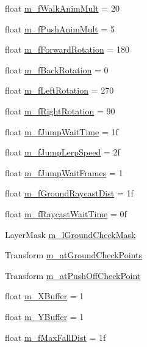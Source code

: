 \begin{DoxyCompactItemize}
\item 
float \mbox{\hyperlink{class_animal_ae003f54a88ce9c5790651eb2e2b739eb}{m\+\_\+f\+Walk\+Anim\+Mult}} = 20
\item 
float \mbox{\hyperlink{class_animal_a16a1fc92968f20b95877a6afff3108e7}{m\+\_\+f\+Push\+Anim\+Mult}} = 5
\item 
float \mbox{\hyperlink{class_animal_ac662f1892b85515e76ec7873d482df89}{m\+\_\+f\+Forward\+Rotation}} = 180
\item 
float \mbox{\hyperlink{class_animal_ae0c82e64109cba8e3186bec644f72ff4}{m\+\_\+f\+Back\+Rotation}} = 0
\item 
float \mbox{\hyperlink{class_animal_ae20b6c637e8cd4334fe8e0bff05a7872}{m\+\_\+f\+Left\+Rotation}} = 270
\item 
float \mbox{\hyperlink{class_animal_afe3df93e1c665aeb4232690655e81c34}{m\+\_\+f\+Right\+Rotation}} = 90
\item 
float \mbox{\hyperlink{class_animal_a62e54a6e632478daff40256ce4d3fbd5}{m\+\_\+f\+Jump\+Wait\+Time}} = 1f
\item 
float \mbox{\hyperlink{class_animal_a577330859c3a5bf5b0ae5690eb03dc3b}{m\+\_\+f\+Jump\+Lerp\+Speed}} = 2f
\item 
float \mbox{\hyperlink{class_animal_aa644cc3baee4917c5a8ff4ce6a7f5213}{m\+\_\+f\+Jump\+Wait\+Frames}} = 1
\item 
float \mbox{\hyperlink{class_animal_ad61d1d395ce25fc4996a0385347b7dd3}{m\+\_\+f\+Ground\+Raycast\+Dist}} = 1f
\item 
float \mbox{\hyperlink{class_animal_af615d2651b634514c081cdf5e8d0f5ed}{m\+\_\+f\+Raycast\+Wait\+Time}} = 0f
\item 
Layer\+Mask \mbox{\hyperlink{class_animal_a4dac26b3c8c4c5382d1d03ec917fe836}{m\+\_\+l\+Ground\+Check\+Mask}}
\item 
Transform \mbox{\hyperlink{class_animal_a52e29a5e08389bff22aa3c58fd51c51e}{m\+\_\+at\+Ground\+Check\+Points}}
\item 
Transform \mbox{\hyperlink{class_animal_af82430c5d281f7e015d07f65949b483d}{m\+\_\+at\+Push\+Off\+Check\+Point}}
\item 
float \mbox{\hyperlink{class_animal_a983bda54f5ac80081085024ddb6b1199}{m\+\_\+\+X\+Buffer}} = 1
\item 
float \mbox{\hyperlink{class_animal_a052f059393b9e50b56bb4b5d16ef8c8d}{m\+\_\+\+Y\+Buffer}} = 1
\item 
float \mbox{\hyperlink{class_animal_ac359d09f810b54f1707f02c7958ff639}{m\+\_\+f\+Max\+Fall\+Dist}} = 1f
\item 

\end{DoxyCompactItemize}
